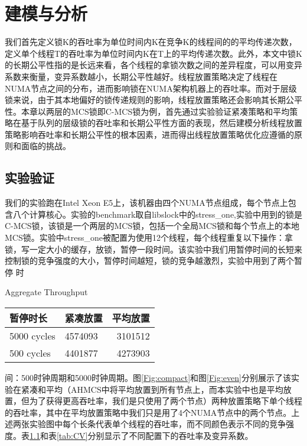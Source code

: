 
\chapter{建模与分析}
\label{chap:example}
我们首先定义锁K的吞吐率为单位时间内K在竞争K的线程间的的平均传递次数，定义单个线程T的吞吐率为单位时间内K在T上的平均传递次数。此外，本文中锁K的长期公平性指的是长远来看，各个线程的拿锁次数之间的差异程度，可以用变异系数来衡量，变异系数越小，长期公平性越好。线程放置策略决定了线程在NUMA节点之间的分布，进而影响锁在NUMA架构机器上的吞吐率。而对于层级锁来说，由于其本地偏好的锁传递规则的影响，线程放置策略还会影响其长期公平性。本章以两层的MCS锁即C-MCS锁为例，首先通过实验验证紧凑策略和平均策略在基于队列的层级锁的吞吐率和长期公平性方面的表现，然后建模分析线程放置策略影响吞吐率和长期公平性的根本因素，进而得出线程放置策略优化应遵循的原则和面临的挑战。

\section{实验验证}
我们的实验跑在Intel Xeon E5上，该机器由四个NUMA节点组成，每个节点上包含八个计算核心。实验的benchmark取自libslock中的stress\_one,实验中用到的锁是C-MCS锁，该锁是一个两层的MCS锁，包括一个全局MCS锁和每个节点上的本地MCS锁。实验中stress\_one被配置为使用12个线程，每个线程重复以下操作：拿锁，写一定大小的缓存，放锁，暂停一段时间。该实验中我们用暂停时间的长短来控制锁的竞争强度的大小，暂停时间越短，锁的竞争越激烈，实验中用到了两个暂停
时\begin{table}[!hpb]
  \centering
    {Aggregate Throughput}
  \label{tab:aggregate}
  \begin{tabular}{@{}llr@{}} \toprule
    暂停时长 & 紧凑放置 & 平均放置\\ \midrule
    5000 cycles & 4574093 & 3101512 \\
    500  cycles & 4401877 & 4273903\\
  \end{tabular}
\end{table}
间：500时钟周期和5000时钟周期。图\ref{Fig:compact}和图\ref{Fig:even}分别展示了该实验在紧凑和平均（AHMCS中将平均放置到所有节点上，而本实验中也是平均放置，但为了获得更高吞吐率，我们是只使用了两个节点）两种放置策略下单个线程的吞吐率，其中在平均放置策略中我们只是用了4个NUMA节点中的两个节点。上述两张实验图中每个长条代表单个线程的吞吐率，而不同颜色表示不同的竞争强度。表\ref{tab:aggregate}和表\ref{tab:CV}分别显示了不同配置下的吞吐率及变异系数。

